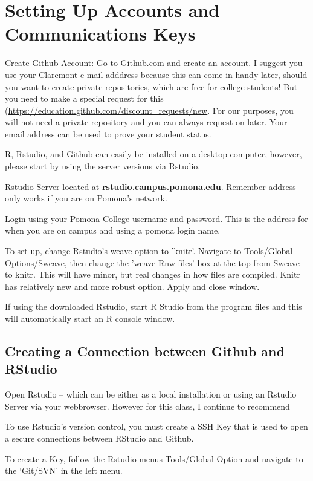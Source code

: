 \documentclass[12pt]{../SOP4_alpha}\usepackage[]{graphicx}\usepackage[]{color}
\begin{document}
\section{Setting Up Accounts and Communications Keys}

\NP Create Github Account: Go to \href{http:\\github.com}{Github.com} and create an account. I suggest you use your Claremont e-mail adddress because this can come in handy later, should you want to create private repositories, which are free for college students! But you need to make a special request for this (\url{https://education.github.com/discount_requests/new}. For our purposes, you will not need a private repository and you can always request on later. Your email address can be used to prove your student status. 
  

\NP R, Rstudio, and Github can easily be installed on a desktop computer, however, please start by using the server versions via Rstudio. 

\NP Rstudio Server located at \href{http://rstudio.campus.pomona.edu}{\textbf{rstudio.campus.pomona.edu}}. Remember address only works if you are on Pomona's network. 

\NP Login using your Pomona College username and password. This is the address for when you are on campus and using a pomona login name. 

\NP To set up, change Rstudio's weave option to 'knitr'. Navigate to Tools/Global Options/Sweave, then change the 'weave Rnw files' box at the top from Sweave to knitr. This will have minor, but real changes in how files are compiled. Knitr has relatively new and more robust option. Apply and close window. 

\NP If using the downloaded Rstudio, start R Studio from the program files and this will automatically start an R console window.

\subsection{Creating a Connection between Github and RStudio}

\NP Open Rstudio -- which can be either as a local installation or using an Rstudio Server via your webbrowser. However for this class, I continue to recommend

\NP To use Rstudio's version control, you must create a SSH Key that is used to open a secure connections between RStudio and Github.

\NP To create a Key, follow the Rstudio menus Tools/Global Option and navigate to the `Git/SVN' in the left menu.
\end{document}
